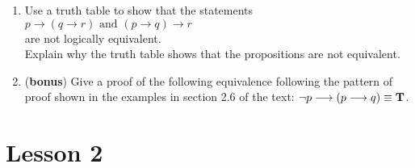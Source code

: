 \documentclass[11pt]{amsart}
\begin{document}
\begin{enumerate}
\item Use a truth table to show that the statements $p\longrightarrow (q\longrightarrow r) \text{ and  }(p\longrightarrow q)\longrightarrow r$ \\
are not logically equivalent. \\
Explain why the truth table shows that the propositions are not equivalent.\\[10pt]


\item ({\bf bonus}) Give a proof of the following equivalence following the pattern
of proof shown in the examples in section 2.6 of the text:  $\neg p\longrightarrow(p\longrightarrow q)\equiv {\bf T}$.\\[10pt]

\end{enumerate}

\section{Lesson 2}
\end{document}
